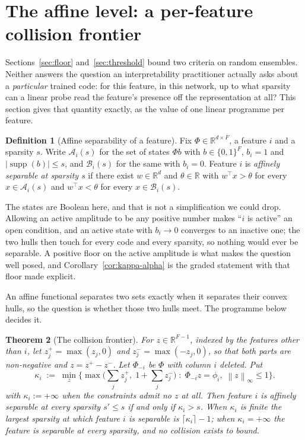 \documentclass[preprint,12pt]{elsarticle}
\newtheorem{theorem}{Theorem}[section]
\theoremstyle{definition}
\newtheorem{definition}[theorem]{Definition}
\newcommand{\R}{\mathbb{R}}
\newcommand{\norm}[1]{\left\lVert #1 \right\rVert}
\begin{document}
\section{The affine level: a per-feature collision frontier}
\label{sec:frontier}

Sections~\ref{sec:floor} and~\ref{sec:threshold} bound two criteria on random ensembles. Neither
answers the question an interpretability practitioner actually asks about a \emph{particular}
trained code: for this feature, in this network, up to what sparsity can a linear probe read the
feature's presence off the representation at all? This section gives that quantity exactly, as
the value of one linear programme per feature.

\begin{definition}[Affine separability of a feature]
\label{def:affsep}
Fix $\Phi\in\R^{d\times F}$, a feature $i$ and a sparsity $s$. Write $\mathcal A_i(s)$ for the
set of states $\Phi b$ with $b\in\{0,1\}^F$, $b_i=1$ and $|\operatorname{supp}(b)|\le s$, and
$\mathcal B_i(s)$ for the same with $b_i=0$. Feature $i$ is \emph{affinely separable at sparsity
$s$} if there exist $w\in\R^d$ and $\theta\in\R$ with $w^{\top}x>\theta$ for every
$x\in\mathcal A_i(s)$ and $w^{\top}x<\theta$ for every $x\in\mathcal B_i(s)$.
\end{definition}

The states are Boolean here, and that is not a simplification we could drop. Allowing an active
amplitude to be any positive number makes ``$i$ is active'' an open condition, and an active
state with $b_i\to0$ converges to an inactive one; the two hulls then touch for every code and
every sparsity, so nothing would ever be separable. A positive floor on the active amplitude is
what makes the question well posed, and Corollary~\ref{cor:kappa-alpha} is the graded statement
with that floor made explicit.

An affine functional separates two sets exactly when it separates their convex hulls, so the
question is whether those two hulls meet. The programme below decides it.

\begin{theorem}[The collision frontier]
\label{thm:frontier}
For $z\in\R^{F-1}$, indexed by the features other than $i$, let $z^{+}_j=\max(z_j,0)$ and
$z^{-}_j=\max(-z_j,0)$, so that both parts are non-negative and $z=z^{+}-z^{-}$. Let
$\Phi_{-i}$ be $\Phi$ with column $i$ deleted. Put
\begin{equation}
  \kappa_i\;:=\;\min_{z}\Big\{\max\big(\textstyle\sum_j z^{+}_j,\;1+\sum_j z^{-}_j\big)
  \;:\;\Phi_{-i}z=\phi_i,\;\norm{z}_\infty\le1\Big\}.
  \label{eq:kappa}
\end{equation}
with $\kappa_i:=+\infty$ when the constraints admit no $z$ at all. Then feature $i$ is affinely
separable at every sparsity $s'\le s$ if and only if $\kappa_i>s$. When $\kappa_i$ is finite the
largest sparsity at which feature $i$ is separable is $\lceil\kappa_i\rceil-1$; when
$\kappa_i=+\infty$ the feature is separable at every sparsity, and no collision exists to bound.
\end{theorem}
\end{document}
